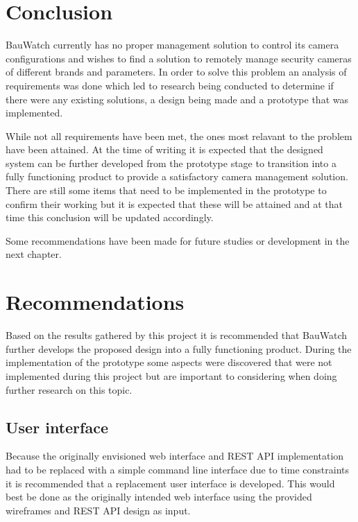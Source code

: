 \chapter{Conclusion}
BauWatch currently has no proper management solution to control its camera configurations and wishes to find a solution to remotely manage security cameras of different brands and parameters.
In order to solve this problem an analysis of requirements was done which led to research being conducted to determine if there were any existing solutions, a design being made and a prototype that was implemented.

While not all requirements have been met, the ones most relavant to the problem have been attained.
At the time of writing it is expected that the designed system can be further developed from the prototype stage to transition into a fully functioning product to provide a satisfactory camera management solution.
There are still some items that need to be implemented in the prototype to confirm their working but it is expected that these will be attained and at that time this conclusion will be updated accordingly.

Some recommendations have been made for future studies or development in the next chapter.

\chapter{Recommendations}
Based on the results gathered by this project it is recommended that BauWatch further develops the proposed design into a fully functioning product.
During the implementation of the prototype some aspects were discovered that were not implemented during this project but are important to considering when doing further research on this topic.

\section{User interface}
Because the originally envisioned web interface and REST API implementation had to be replaced with a simple command line interface due to time constraints it is recommended that a replacement user interface is developed.
This would best be done as the originally intended web interface using the provided wireframes and REST API design as input.

